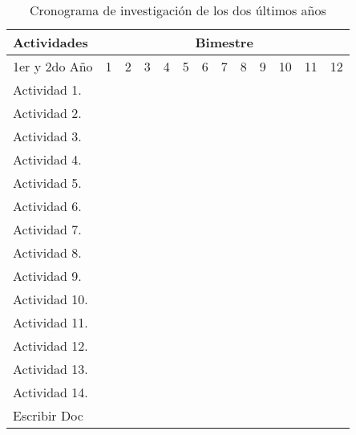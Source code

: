 \begin{table}[!htb]
  \centering
  \newcommand{\Bk}{\multicolumn{1}{|G|}{ }}
  \begin{tabular}{|p{3.0cm}||c|c|c|c|c|c|c|c|c|c|c|c|}\hline
    Actividades&\multicolumn{12}{|c|}{Bimestre}\\\hline\hline
    1er y  2do A\~no&1&2 &3  &4  &5  &6  &7  &8  &9  &10 &11 &12 \\\hline
    Actividad 1. &\Bk&   &   &   &   &   &   &   &   &   &   &   \\\hline
    Actividad 2. &\Bk&\Bk&\Bk&\Bk&\Bk&\Bk&\Bk&   &   &\Bk&\Bk&   \\\hline
    Actividad 3. &\Bk&\Bk&\Bk&\Bk&\Bk&\Bk&\Bk&   &   &\Bk&\Bk&   \\\hline
    Actividad 4. &\Bk&   &   &   &   &   &   &   &   &   &   &   \\\hline
    Actividad 5. &   &   &   &   &   &   &   &   &   &   &   &   \\\hline
    Actividad 6. &   &   &   &   &\Bk&   &   &   &   &   &   &   \\\hline
    Actividad 7. &\Bk&   &   &\Bk&\Bk&   &   &   &   &   &   &   \\\hline
    Actividad 8. &   &   &   &   &   &   &   &   &   &   &   &   \\\hline
    Actividad 9. &\Bk&   &   &\Bk&\Bk&   &   &\Bk&\Bk&   &   &   \\\hline
    Actividad 10.&   &   &   &   &   &   &\Bk&   &   &   &\Bk&   \\\hline
    Actividad 11.&\Bk&   &   &   &   &   &\Bk&   &   &   &\Bk&   \\\hline
    Actividad 12.&\Bk&\Bk&\Bk&\Bk&\Bk&\Bk&\Bk&\Bk&\Bk&\Bk&\Bk&\Bk\\\hline
    Actividad 13.&   &   &   &\Bk&\Bk&   &   &\Bk&   &   &   &   \\\hline
    Actividad 14.&   &   &   &   &\Bk&\Bk&\Bk&   &\Bk&\Bk&\Bk&\Bk\\\hline
    Escribir Doc &   &\Bk&   &\Bk&   &\Bk&   &\Bk&   &\Bk&\Bk&\Bk\\\hline    
  \end{tabular}
  \caption{Cronograma de investigaci\'on de los dos \'ultimos a\~nos}
  \label{tab:crono2}
\end{table}

